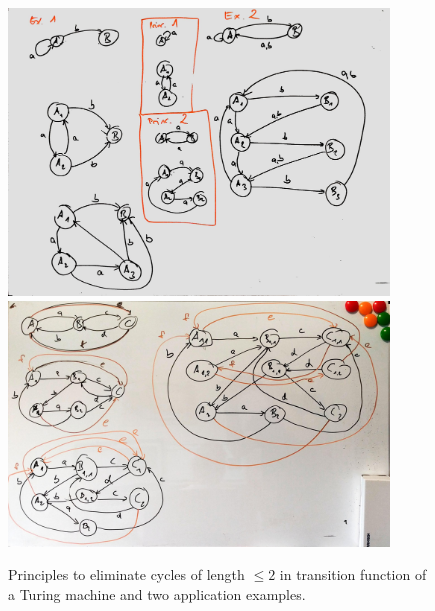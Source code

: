 \begin{figure}
    \centering
    \includegraphics[width=0.9\textwidth]{figures/correctness/orchestration/cycle_elimination.jpg}\\
    \includegraphics[width=0.9\textwidth]{figures/correctness/orchestration/cycle_elimination2.jpg}
    \caption[Cycle elimination in Turing machine transition functions]{Principles to eliminate cycles of length $\leq 2$ in transition function of a Turing machine and two application examples.}
    \label{fig:orchestration:cycle_elimination}
\end{figure}


